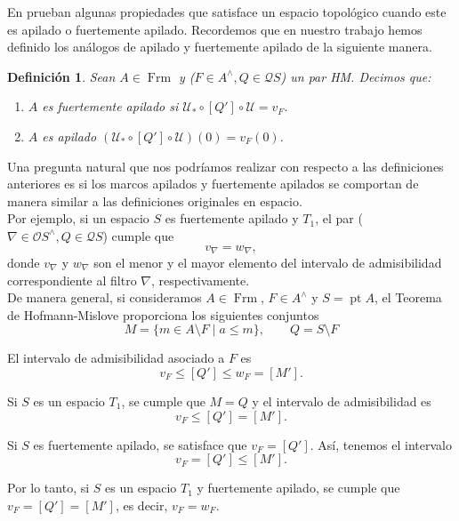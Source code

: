 \documentclass[12pt]{article}
\newtheorem{dfn}[thm]{Definición}
\DeclareMathOperator{\Frm}{Frm}
\DeclareMathOperator{\pt}{pt}
\begin{document}
En \cite{sexton2006ordinal, simmons2004vietoris} prueban algunas propiedades que satisface un espacio topológico cuando este es apilado o fuertemente 
apilado. Recordemos que en nuestro trabajo hemos definido los análogos de apilado y fuertemente apilado de la siguiente manera.

\begin{dfn}\label{def:apilado-marcos}
Sean $A\in \Frm$ y ($F\in A^\wedge, Q\in \mathcal{Q}S$) un par HM. Decimos que:
\begin{enumerate}
  \item $A$ es fuertemente apilado si $\mathcal{U}_*\circ[Q']\circ\mathcal{U}=v_F$.
  \item $A$ es apilado $(\mathcal{U}_*\circ [Q']\circ \mathcal{U})(0)=v_F(0)$.
\end{enumerate}
\end{dfn}

Una pregunta natural que nos podríamos realizar con respecto a las definiciones anteriores es si los marcos apilados y fuertemente 
apilados se comportan de manera similar a las definiciones originales en espacio.\\

Por ejemplo, si un espacio $S$ es fuertemente apilado y $T_1$, el par ($\nabla\in \mathcal{O}S^\wedge, Q\in \mathcal{Q}S$) cumple que
\begin{equation}\label{v=w}
v_\nabla=w_\nabla,
\end{equation}
donde $v_\nabla$ y $w_\nabla$ son el menor y el mayor elemento del intervalo de admisibilidad correspondiente al filtro $\nabla$, respectivamente.\\

De manera general, si consideramos $A\in \Frm$, $F\in A^\wedge$ y $S=\pt A$, el Teorema de Hofmann-Mislove proporciona los siguientes conjuntos
\[
M=\{m\in A\setminus F\mid a\leq m\},\qquad Q=S\setminus F
\]

El intervalo de admisibilidad asociado a $F$ es
\[
v_F\leq [Q']\leq w_F=[M'].
\]

Si $S$ es un espacio $T_1$, se cumple que $M=Q$ y el intervalo de admisibilidad es
\[
v_F\leq [Q']=[M'].
\]

Si $S$ es fuertemente apilado, se satisface que $v_F=[Q']$. Así, tenemos el intervalo
\[
v_F=[Q']\leq [M'].
\]

Por lo tanto, si $S$ es un espacio $T_1$ y fuertemente apilado, se cumple que $v_F=[Q']=[M']$, es decir, $v_F=w_F$.\\
\end{document}
